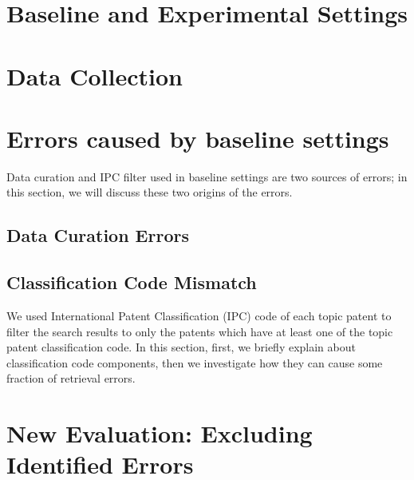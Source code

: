 \label{cha:BaselineIRFramework}
\section{Baseline and Experimental Settings}
\label{sec:settings}

\section{Data Collection}
\label{sec:DataCollection}

\section{Errors caused by baseline settings}
Data curation and IPC filter used in baseline settings are two sources of errors;
in this section, we will discuss these two origins of the errors.

\subsection{Data Curation Errors}
\label{sec:DataCurationErrors}

\subsection{Classification Code Mismatch}
We used International Patent Classification (IPC) code of each topic patent to filter the search results to only the patents which have at least one of the topic patent classification code. In this section, first, we briefly explain about classification code components, then we investigate how they can cause some fraction of retrieval errors.
\label{sec:ClassificationCodeMismatch}

\section{New Evaluation: Excluding Identified Errors}


